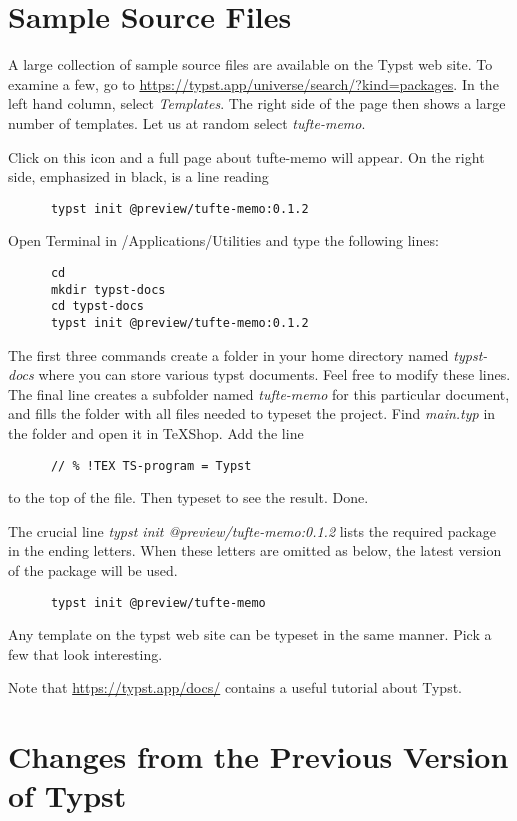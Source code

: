 \documentclass[11pt, oneside]{article}   	%
\begin{document}
\newpage
\section{Sample Source Files}

A large collection of sample source files are available on the Typst web site. To examine a few, go to
 \url{https://typst.app/universe/search/?kind=packages}. In the left hand column, select {\em Templates}. 
 The right side of the page then shows a large number of templates. Let us at random select {\em tufte-memo}.
 
 Click on this icon and a full page about tufte-memo will appear. On the right side, emphasized in black,
 is a line reading
 \begin{verbatim}
      typst init @preview/tufte-memo:0.1.2
\end{verbatim}
Open Terminal in /Applications/Utilities and type the following lines:
\begin{verbatim}
      cd
      mkdir typst-docs
      cd typst-docs
      typst init @preview/tufte-memo:0.1.2
\end{verbatim}
The first three commands create a folder in your home directory named {\em typst-docs} where you can store
 various typst documents. Feel free to modify these lines. The final line  creates a subfolder named {\em tufte-memo} for
 this particular document, and fills the folder with all files needed to typeset the project. Find {\em main.typ}
 in the folder and open it in TeXShop.  Add the line
 \begin{verbatim}
      // % !TEX TS-program = Typst
\end{verbatim}
to the top of the file. Then typeset to see the result. Done.

The crucial line {\em  typst init @preview/tufte-memo:0.1.2} lists the required package in the ending letters.
When these letters are omitted as below, the latest version of the package will be used.
\begin{verbatim}
      typst init @preview/tufte-memo
\end{verbatim}
Any template on the typst web site can be typeset in the same manner. Pick a few that look interesting.

Note that \url{https://typst.app/docs/} contains a useful tutorial about Typst. 

\section{Changes from the Previous Version of Typst}
\end{document}
